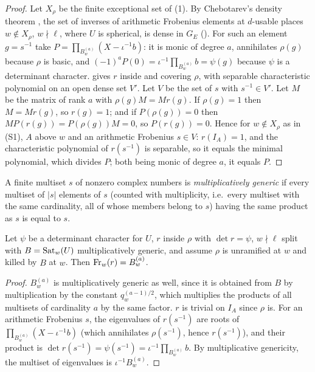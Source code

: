\begin{proof}
Let $X_\rho$ be the finite exceptional set of (1). By Chebotarev's density theorem \cite{Chebotarev1926}, the set of
inverses of arithmetic Frobenius elements at $d$-usable places $w\notin X_\rho$, $w\nmid\ell$, where $U$ is spherical, is
dense in $G_E$ (). For such an element $g=s^{-1}$ take
$P=\prod_{B^{(a)}_w}(X-\iota^{-1}b)$: it is monic of degree $a$, annihilates $\rho(g)$ because $\rho$ is basic, and
$(-1)^aP(0)=\iota^{-1}\prod_{B^{(a)}_w}b=\psi(g)$ because $\psi$ is a determinant character.  gives
$r$ inside and covering $\rho$, with separable characteristic polynomial on an open dense set $V'$. Let $V$ be the set of
$s$ with $s^{-1}\in V'$. Let $M$ be the matrix of rank $a$ with $\rho(g)M=Mr(g)$. If $\rho(g)=1$ then $M=Mr(g)$, so
$r(g)=1$; and if $P(\rho(g))=0$ then $MP(r(g))=P(\rho(g))M=0$, so $P(r(g))=0$. Hence for $w\notin X_\rho$ as in (S1), $A$
above $w$ and an arithmetic Frobenius $s\in V$: $r(I_A)=1$, and the characteristic polynomial of $r(s^{-1})$ is separable, so
it equals the minimal polynomial, which divides $P$; both being monic of degree $a$, it equals $P$.
\end{proof}

A finite multiset $s$ of nonzero complex numbers is \emph{multiplicatively generic} if every multiset of $|s|$ elements of
$s$ (counted with multiplicity, i.e.\ every multiset with the same cardinality, all of whose members belong to $s$) having
the same product as $s$ is equal to $s$.

\begin{lemma}\label{pf:galred:frobcond}
Let $\psi$ be a determinant character for $U$, $r$ inside $\rho$ with $\det r=\psi$, $w\nmid\ell$ split with
$B=\operatorname{Sat}_w(U)$ multiplicatively generic, and assume $\rho$ is unramified at $w$ and killed by $B$ at $w$. Then
$\operatorname{Fr}_w(r)=B^{(a)}_w$.
\end{lemma}

\begin{proof}
$B^{(a)}_w$ is multiplicatively generic as well, since it is obtained from $B$ by multiplication by the constant
$q_w^{(a-1)/2}$, which multiplies the products of all multisets of cardinality $a$ by the same factor. $r$ is trivial on $I_A$
since $\rho$ is. For an arithmetic Frobenius $s$, the eigenvalues of $r(s^{-1})$ are roots of
$\prod_{B^{(a)}_w}(X-\iota^{-1}b)$ (which annihilates $\rho(s^{-1})$, hence $r(s^{-1})$), and their product is $\det r(s^{-1})=
\psi(s^{-1})=\iota^{-1}\prod_{B^{(a)}_w}b$. By multiplicative genericity, the multiset of eigenvalues is $\iota^{-1}B^{(a)}_w$.
\end{proof}

